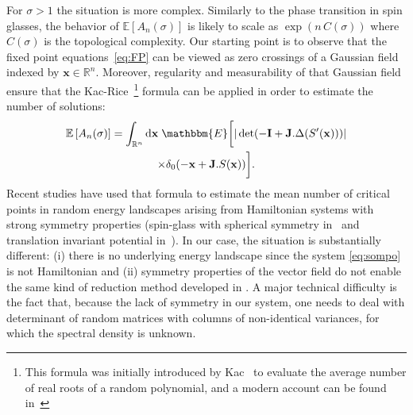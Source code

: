 For $\sigma>1$ the situation is more complex. Similarly to the phase transition in spin glasses, the behavior of ${\mathbb{E}\left [ {A_n(\sigma)} \right]}$ is likely to scale as $\exp(n\,C(\sigma))$ where $C(\sigma)$ is the {topological complexity}. Our starting point is to observe that the fixed point equations~\eqref{eq:FP} can be viewed as zero crossings of a Gaussian field indexed by ${\mathbf{x}}\in{\mathbb{R}}^n$. Moreover, regularity and measurability of that Gaussian field ensure that the Kac-Rice~\footnote{This formula was initially introduced by Kac~\cite{kac:43} to evaluate the average number of real roots of a random polynomial, and a modern account can be found in~\cite{azais:09,adler-taylor:07}} formula can be applied in order to estimate the number of solutions:
\begin{multline*}
	{\mathbb{E}\left [ {A_n(\sigma)} \right]} = \int_{{\mathbb{R}}^n} \textrm{d}{\mathbf{x}} \;\mathbbm{E}\bigg[ |\det (-{\mathbf{I}} + {\mathbf{J}}.\Delta (S'({\mathbf{x}})))| \\
	\times \delta_0(-{\mathbf{x}}+{\mathbf{J}}.S({\mathbf{x}}))\bigg]. 
\end{multline*}
Recent studies \cite{fyodorov:04,fyodorov-williams:07, auffinger-ben-arous:11} have used that formula to estimate the mean number of critical points in random energy landscapes arising from Hamiltonian systems with strong symmetry properties (spin-glass with spherical symmetry in~\cite{auffinger-ben-arous:11} and translation invariant potential in~\cite{fyodorov:04,fyodorov-williams:07}). In our case, the situation is substantially different: (i) there is no underlying energy landscape since the system \eqref{eq:sompo} is not Hamiltonian and (ii) symmetry properties of the vector field do not enable the same kind of reduction method developed in \cite{auffinger-ben-arous:11,fyodorov-williams:07,fyodorov:04}. A major technical difficulty is the fact that, because the lack of symmetry in our system, one needs to deal with determinant of random matrices with columns of non-identical variances, for which the spectral density is unknown. 

